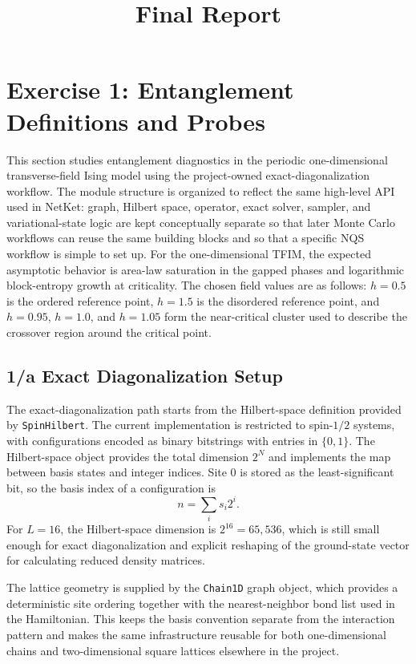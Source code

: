 \documentclass[11pt,a4paper]{article}
\title{Final Report}
\author{}
\date{}
\begin{document}
\maketitle
\section*{Exercise 1: Entanglement Definitions and Probes}

    This section studies entanglement diagnostics in the periodic one-dimensional transverse-field Ising model using the project-owned exact-diagonalization workflow. The module structure is organized to reflect the same high-level API used in NetKet: graph, Hilbert space, operator, exact solver, sampler, and variational-state logic are kept conceptually separate so that later Monte Carlo workflows can reuse the same building blocks and so that a specific NQS workflow is simple to set up. For the one-dimensional TFIM, the expected asymptotic behavior is area-law saturation in the gapped phases and logarithmic block-entropy growth at criticality. The chosen field values are as follows: $h=0.5$ is the ordered reference point, $h=1.5$ is the disordered reference point, and $h=0.95$, $h=1.0$, and $h=1.05$ form the near-critical cluster used to describe the crossover region around the critical point.

    \subsection*{1/a Exact Diagonalization Setup}

    The exact-diagonalization path starts from the Hilbert-space definition provided by \texttt{SpinHilbert}. The current implementation is restricted to spin-$1/2$ systems, with configurations encoded as binary bitstrings with entries in $\{0,1\}$. The Hilbert-space object provides the total dimension $2^N$ and implements the map between basis states and integer indices. Site $0$ is stored as the least-significant bit, so the basis index of a configuration is
    \begin{equation}
        n = \sum_i s_i 2^i .
    \end{equation}
    For $L=16$, the Hilbert-space dimension is $2^{16}=65{,}536$, which is still small enough for exact diagonalization and explicit reshaping of the ground-state vector for calculating reduced density matrices.

    The lattice geometry is supplied by the \texttt{Chain1D} graph object, which provides a deterministic site ordering together with the nearest-neighbor bond list used in the Hamiltonian. This keeps the basis convention separate from the interaction pattern and makes the same infrastructure reusable for both one-dimensional chains and two-dimensional square lattices elsewhere in the project.
\end{document}
